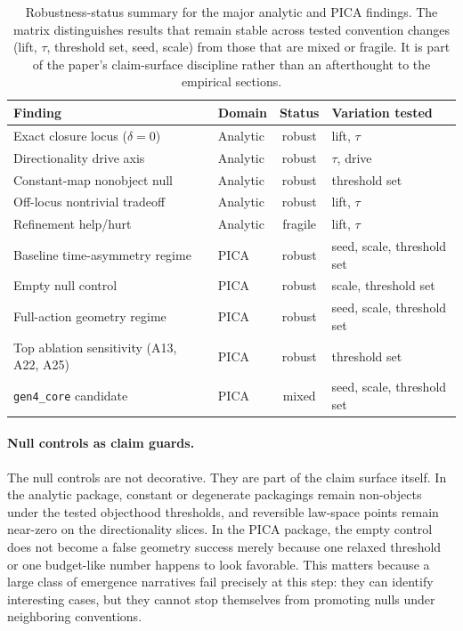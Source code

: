\documentclass[11pt]{article}
\theoremstyle{definition}
\begin{document}
\begin{table}[t]
    \centering
    \caption{Robustness-status summary for the major analytic and PICA findings. The matrix distinguishes results that remain stable across tested convention changes (lift, $\tau$, threshold set, seed, scale) from those that are mixed or fragile. It is part of the paper's claim-surface discipline rather than an afterthought to the empirical sections.}
    \label{fig:robustness_matrix}
    \smallskip
    {\small
    \setlength{\tabcolsep}{5pt}
    \begin{tabular}{@{}llcl@{}}
    \toprule
    \textbf{Finding} & \textbf{Domain} & \textbf{Status} & \textbf{Variation tested} \\
    \midrule
    Exact closure locus ($\delta=0$)         & Analytic & robust  & lift, $\tau$ \\
    Directionality drive axis                 & Analytic & robust  & $\tau$, drive \\
    Constant-map nonobject null               & Analytic & robust  & threshold set \\
    Off-locus nontrivial tradeoff             & Analytic & robust  & lift, $\tau$ \\
    Refinement help/hurt                      & Analytic & fragile & lift, $\tau$ \\
    \addlinespace[3pt]
    Baseline time-asymmetry regime            & PICA     & robust  & seed, scale, threshold set \\
    Empty null control                        & PICA     & robust  & scale, threshold set \\
    Full-action geometry regime               & PICA     & robust  & seed, scale, threshold set \\
    Top ablation sensitivity (A13, A22, A25)  & PICA     & robust  & threshold set \\
    \texttt{gen4\_core} candidate             & PICA     & mixed   & seed, scale, threshold set \\
    \bottomrule
    \end{tabular}
    }
\end{table}

\paragraph{Null controls as claim guards.}
The null controls are not decorative. They are part of the claim surface itself. In the analytic package, constant or degenerate packagings remain non-objects under the tested objecthood thresholds, and reversible law-space points remain near-zero on the directionality slices. In the PICA package, the empty control does not become a false geometry success merely because one relaxed threshold or one budget-like number happens to look favorable. This matters because a large class of emergence narratives fail precisely at this step: they can identify interesting cases, but they cannot stop themselves from promoting nulls under neighboring conventions.
\end{document}
